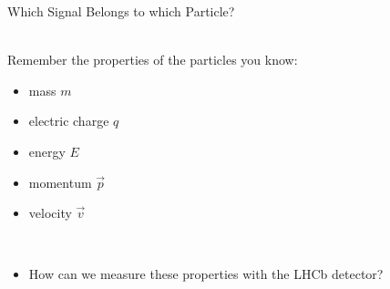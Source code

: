 \begin{frame}{Which Signal Belongs to which Particle?}
    

 \\
Remember the properties of the particles you know: \\
\begin{itemize}
    \item<2-> mass \hfill $m$ \hspace{6cm}\,
    \item<2-> electric charge \hfill $q$ \hspace{6cm}\,
    \item<2-> energy \hfill $E$ \hspace{6cm}\,
    \item<2-> momentum \hfill $\vec{p} $ \hspace{6cm}\,
    \item<2-> velocity \hfill $\vec{v}$ \hspace{6cm}\,
 
 \\
    \item<3->[\ding{220}] How can we measure these properties with the LHCb detector?

    
\end{itemize}
\end{frame}
